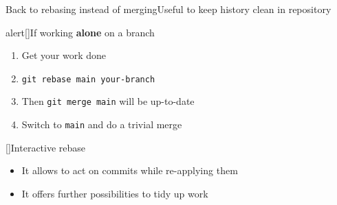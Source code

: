 \documentclass[usenames,svgnames,14pt]{beamer}
\begin{document}
\begin{frame}{Back to rebasing instead of merging}{Useful to keep history clean in repository}
    \begin{varblock}{alert}[\textwidth]{If working \textbf{alone} on a branch}
        \begin{enumerate}
            \item Get your work done
            \item \texttt{git rebase main your-branch}
            \item Then \;\texttt{git merge main}\; will be up-to-date
            \item Switch to \;\texttt{main}\; and do a trivial merge
        \end{enumerate}
    \end{varblock}
    \begin{varblock}{}[\textwidth]{Interactive rebase}
        \begin{itemize}
            \item It allows to act on commits while re-applying them
            \item It offers further possibilities to tidy up work
        \end{itemize}
    \end{varblock}
\end{frame}
\end{document}
